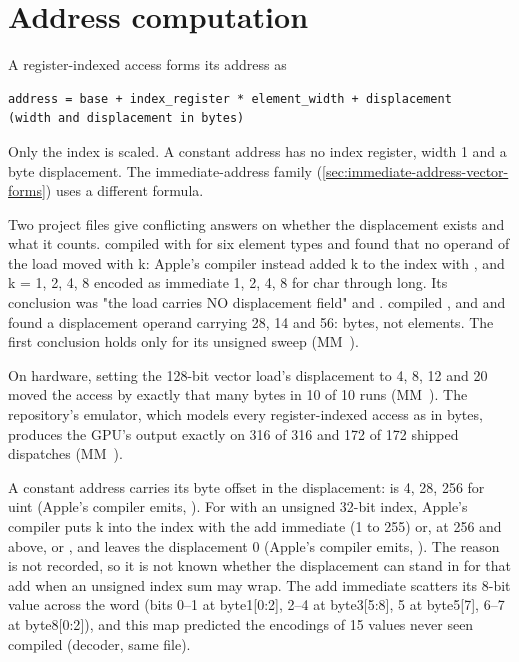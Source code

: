 

\section{Address computation}\label{sec:address-computation}

A register-indexed access forms its address as

\begin{lstlisting}
address = base + index_register * element_width + displacement        (width and displacement in bytes)
\end{lstlisting}

Only the index is scaled. A constant address has no index register, width 1 and a byte
displacement. The immediate-address family (\cref{sec:immediate-address-vector-forms}) uses a different formula.

Two project files give conflicting answers on whether the displacement exists and what it counts.
 compiled  with  for six element types and found that no operand of the load moved with k: Apple's compiler instead added k to the index with , and k = 1, 2, 4, 8 encoded as immediate 1, 2, 4, 8 for char through long. Its conclusion was "the
load carries NO displacement field" and . 
compiled ,  and  and found a displacement operand carrying 28, 14 and 56: bytes, not
elements. The first conclusion holds only for its unsigned  sweep (MM~).

On hardware, setting the 128-bit vector load's displacement to 4, 8, 12 and 20 moved the access by exactly that many bytes in 10 of
10 runs (MM~). The repository's emulator, which models every register-indexed access as
 in bytes, produces the GPU's output exactly on 316 of 316 and 172 of 172 shipped
dispatches (MM~).

A constant address carries its byte offset in the displacement:  is 4,  28,  256 for uint
(Apple's compiler emits, ). For  with an unsigned 32-bit index, Apple's
compiler puts k into the index with the add immediate (1 to 255) or, at 256 and above,  or , and leaves
the displacement 0 (Apple's compiler emits, ). The reason is not recorded, so it is not
known whether the displacement can stand in for that add when an unsigned index sum may wrap. The add immediate scatters
its 8-bit value across the word (bits 0--1 at byte1{[}0:2{]}, 2--4 at byte3{[}5:8{]}, 5 at byte5{[}7{]}, 6--7 at
byte8{[}0:2{]}), and this map predicted the encodings of 15 values never seen compiled (decoder, same file).

